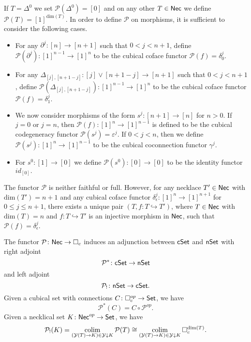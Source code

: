 If $T= \Delta^0$ we set $\mathcal{P}(\Delta^0)=[0]$ and on any other $T \in \mathsf{Nec}$ we define $\mathcal{P}( T )= [1]^{\text{dim}(T)}$. In order to define $\mathcal{P}$ on morphisms, it is sufficient to consider the following cases.
\begin{itemize}
\item For any $\partial^j \colon [n] \to [n+1]$ such that $0< j<{n+1}$, define $\mathcal{P}(\partial^j) \colon [1]^{n-1}\to [1]^{n}$ to be the cubical coface functor $\mathcal{P}(f)= \delta_0^{j}.$ 

\item For any $\Delta_{[j], [n+1-j]} \colon [j] \vee [n+1-j] \to [n+1]$ such that $0<j<n+1$, define $\mathcal{P}(\Delta_{[j], [n+1-j]}) \colon [1]^{n-1}\to [1]^{n}$ to be the cubical coface functor $\mathcal{P}(f)=\delta_1^{j}$.

\item We now consider morphisms of the form $s^j \colon [n+1] \to [n]$ for $n>0$. If $j=0$ or $j=n$, then $\mathcal{P}(f) \colon [1]^n \to [1]^{n-1}$ is defined to be the cubical codegeneracy functor $\mathcal{P}(s^j)= \varepsilon^{j}.$ If $0<j<n$, then we define $\mathcal{P}(s^j) \colon [1]^n \to [1]^{n-1}$ to be the cubical coconnection functor $\gamma^{j}.$

\item For $s^0 \colon [1] \to [0]$ we define $\mathcal{P}(s^0) \colon [0] \to [0]$ to be the identity functor $id_{[0]}.$

\end{itemize}
\begin{remark}
The functor $\mathcal{P}$ is neither faithful or full. However, for any necklace $T' \in \mathsf{Nec}$ with $\text{dim}(T')=n+1$ and any cubical coface functor $\delta_{\epsilon}^j \colon [1]^n \to [1]^{n+1}$ for $0 \leq j \leq n+1$, there exists a unique pair $(T, f \colon T \hookrightarrow T')$, where $T \in \mathsf{Nec}$ with $\text{dim}(T)=n$ and $f \colon T \hookrightarrow T'$ is an injective morphism in $\mathsf{Nec}$, such that $\mathcal{P}(f)=\delta_{\epsilon}^j $.
\end{remark}

The functor $\mathcal{P} \colon \mathsf{Nec} \to \square_c$ induces an adjunction between $\mathsf{cSet}$ and $\mathsf{nSet}$
with right adjoint
$$\mathcal{P}^* \colon \mathsf{cSet} \to \mathsf{nSet}$$
and left adjoint
$$\mathcal{P}_{!}  \colon \mathsf{nSet} \to \mathsf{cSet}.$$
Given a cubical set with connections $C \colon \square_c^{op} \to \mathsf{Set}$, we have $$\mathcal{P}^*(C)= C \circ \mathcal{P}^{op}.$$ Given a necklical set $K \colon \mathsf{Nec}^{op} \to \mathsf{Set}$, we have $$\mathcal{P}_{!}(K)= \operatorname*{colim}_{(\mathcal{Y}(T) \to K) \in \mathcal{Y} \downarrow K} \mathcal{P}(T) \cong \operatorname*{colim}_{(\mathcal{Y}(T) \to K) \in \mathcal{Y} \downarrow K} \square_c^{\text{dim}(T)}.$$



